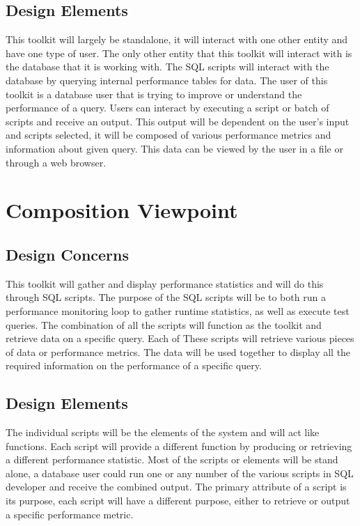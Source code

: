 \documentclass[draftclsnofoot, onecolumn, compsoc, 10pt]{IEEEtran}
\begin{document}
\subsection{Design Elements}
This toolkit will largely be standalone, it will interact with one other entity and have one type of user.
The only other entity that this toolkit will interact with is the database that it is working with.
The SQL scripts will interact with the database by querying internal performance tables for data.
The user of this toolkit is a database user that is trying to improve or understand the performance of a query.
Users can interact by executing a script or batch of scripts and receive an output.
This output will be dependent on the user's input and scripts selected, it will be composed of various performance metrics and information about given query. 
This data can be viewed by the user in a file or through a web browser. 

\section{Composition Viewpoint}
\subsection{Design Concerns}
This toolkit will gather and display performance statistics and will do this through SQL scripts.
The purpose of the SQL scripts will be to both run a performance monitoring loop to gather runtime statistics, as well as execute test queries.
The combination of all the scripts will function as the toolkit and retrieve data on a specific query.
Each of These scripts will retrieve various pieces of data or performance metrics.
The data  will be used together to display all the required information on the performance of a specific query.

\subsection{Design Elements}
The individual scripts will be the elements of the system and will act like functions.
Each script will provide a different function by producing or retrieving a different performance statistic.
Most of the scripts or elements will be stand alone, a database user could run one or any number of the various scripts in SQL developer and receive the combined output.
The primary attribute of a script is its purpose, each script will have a different purpose, either to retrieve or output a specific performance metric.
\end{document}
